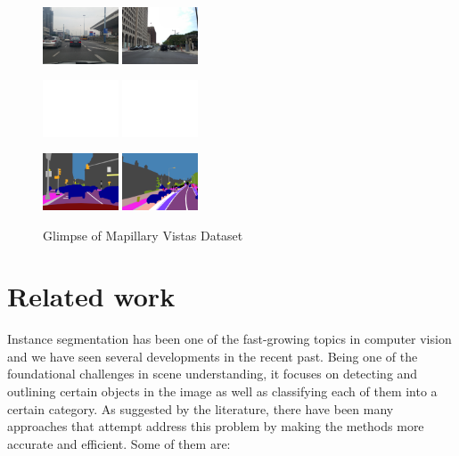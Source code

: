 \documentclass[conference]{IEEEtran}
\begin{document}
\begin{figure}[htbp]
    \centering
    \includegraphics[width=0.20\textwidth]{train1.jpg} 
    \includegraphics[width=0.20\textwidth]{train2.jpg} 
    \vspace{-2em}
\end{figure}
\begin{figure}[htbp]
    \centering
    \includegraphics[width=0.20\textwidth]{val1.jpg} 
    \includegraphics[width=0.20\textwidth]{val2.jpg} 
    \vspace{-2em}
\end{figure}
\begin{figure}[htbp]
    \centering
    \includegraphics[width=0.20\textwidth]{labval1.jpg} 
    \includegraphics[width=0.20\textwidth]{labval2.jpg} 
    \caption{Glimpse of Mapillary Vistas Dataset}
    \label{fig}
\end{figure}

\section{Related work}
Instance segmentation has been one of the fast-growing topics in computer vision and we have seen several developments in the recent past. Being one of the foundational challenges in scene understanding, it focuses on detecting and outlining certain objects in the image as well as classifying each of them into a certain category. As suggested by the literature, there have been many approaches that attempt address this problem by making the methods more accurate and efficient. Some of them are:
\end{document}
